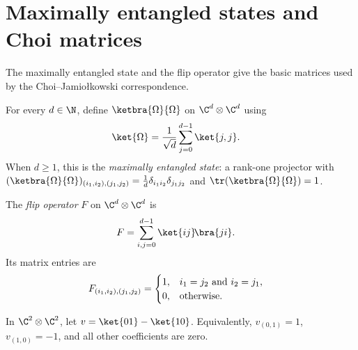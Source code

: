 \section{Maximally entangled states and Choi matrices}
\label{sec:choi_jamiolkowski}

The maximally entangled state and the flip operator give the basic matrices
used by the Choi--Jamio\l{}kowski correspondence.

\begin{definition}\label{def:maximally_entangled}
    \leanok
    For every $d\in\N$, define $\ketbra{\Omega}{\Omega}$ on
    $\C^d\otimes\C^d$ using
    \begin{align}
        \ket{\Omega}
        &= \frac{1}{\sqrt{d}} \sum_{j=0}^{d-1} \ket{j,j}.
        \label{eq:representations_max_entangled}
    \end{align}
    When $d\geq1$, this is the \emph{maximally entangled state}: a rank-one
    projector with
    $(\ketbra{\Omega}{\Omega})_{(i_1,i_2),(j_1,j_2)}
        = \frac{1}{d}\delta_{i_1 i_2}\delta_{j_1 j_2}$
    and $\tr(\ketbra{\Omega}{\Omega})=1$.
\end{definition}

\begin{definition}\label{def:flip_operator}
    \leanok
    The \emph{flip operator} $F$ on $\C^d \otimes \C^d$ is
    \begin{align}
        F
        &= \sum_{i,j=0}^{d-1} \ket{ij}\!\bra{ji}.
        \label{eq:representations_flip}
    \end{align}
    Its matrix entries are
    \begin{align}
        F_{(i_1,i_2),(j_1,j_2)}
        &=
        \begin{cases}
            1, & i_1=j_2 \text{ and } i_2=j_1,\\
            0, & \text{otherwise}.
        \end{cases}
        \notag
    \end{align}
\end{definition}

\begin{definition}
    \label{def:fin_two_antisymm_vec}
    \leanok
    In $\C^2 \otimes \C^2$, let $v = \ket{01} - \ket{10}$.
    Equivalently, $v_{(0,1)}=1$, $v_{(1,0)}=-1$, and all other coefficients
    are zero.
\end{definition}

